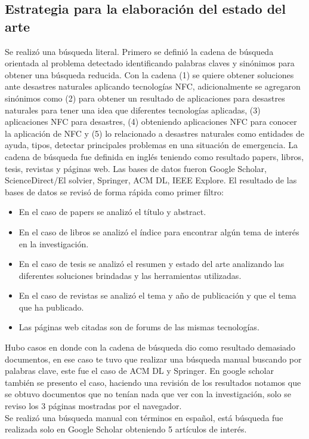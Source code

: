 \documentclass[11pt,openany]{book}
\begin{document}
	\subsection{Estrategia para la elaboración del estado del arte}
	Se realizó una búsqueda literal. Primero se definió la cadena de búsqueda orientada al problema detectado identificando palabras claves  y sinónimos para obtener una búsqueda reducida. Con la cadena (1) se quiere obtener soluciones ante desastres naturales aplicando tecnologías NFC, adicionalmente se agregaron sinónimos como (2) para obtener un resultado de aplicaciones para desastres naturales para tener una idea que diferentes tecnologías aplicadas, (3) aplicaciones NFC para desastres, (4) obteniendo aplicaciones NFC para conocer la aplicación de NFC y (5) lo relacionado a desastres naturales como entidades de ayuda, tipos, detectar principales problemas en una situación de emergencia. La cadena de búsqueda fue definida en inglés teniendo como resultado papers, libros, tesis, revistas y páginas web.
	Las bases de datos fueron Google Scholar, ScienceDirect/El solvier, Springer, ACM DL, IEEE Explore. El resultado de las bases de datos se revisó de forma rápida como primer filtro:
	\begin{itemize}
		\item En el caso de papers se analizó el título y abstract.
		\item En el caso de libros se analizó el índice para encontrar algún tema de interés en la investigación.
		\item En el caso de tesis se analizó el resumen y estado del arte analizando las diferentes soluciones brindadas y las herramientas utilizadas.
		\item En el caso de revistas se analizó el tema y año de publicación y que el tema que ha publicado.
		\item Las páginas web citadas son de forums de las mismas tecnologías.
	\end{itemize}
	
	Hubo casos en donde con la cadena de búsqueda dio como resultado demasiado documentos, en ese caso te tuvo que realizar una búsqueda manual buscando por palabras clave, este fue el caso de ACM DL y Springer. En google scholar también se presento el caso, haciendo una revisión de los resultados notamos que se obtuvo documentos que no tenían nada que ver con la investigación, solo se reviso los 3 páginas mostradas por el navegador. \\

	Se realizó una búsqueda manual con términos en español, está búsqueda fue realizada solo en Google Scholar obteniendo 5 artículos de interés.
\end{document}
